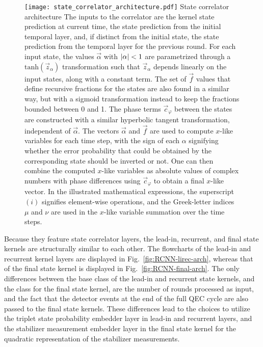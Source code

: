 \begin{figure*}[htb]
\centering
\texttt{[image: state\_correlator\_architecture.pdf]}
\ccaption
{State correlator architecture}
{
The inputs to the correlator are the kernel state prediction at current time, the state prediction from the initial temporal layer, and, if distinct from the initial state, the state prediction from the temporal layer for the previous round. 
For each input state, the values $\vec{\alpha}$ with $\lvert \alpha \rvert<1$ are parametrized through a $\mathrm{tanh}(\vec{z}_\alpha)$ transformation such that $\vec{z}_\alpha$ depends linearly on the input states, along with a constant term. The set of $\vec{f}$ values that define recursive fractions for the states are also found in a similar way, but with a sigmoid transformation instead to keep the fractions bounded between 0 and 1. 
The phase terms $\vec{c}_\varphi$ between the states are constructed with a similar hyperbolic tangent transformation, independent of $\vec{\alpha}$. 
The vectors $\vec{\alpha}$ and $\vec{f}$ are used to compute $x$-like variables for each time step, with the sign of each $\alpha$ signifying whether the error probability that could be obtained by the corresponding state should be inverted or not. One can then combine the computed $x$-like variables as absolute values of complex numbers with phase differences using $\vec{c}_\varphi$ to obtain a final $x$-like vector. In the illustrated mathematical expressions, the superscript $(i)$ signifies element-wise operations, and the Greek-letter indices $\mu$ and $\nu$ are used in the $x$-like variable summation over the time steps.
}
\label{fig:RCNN-state-corr}
\end{figure*}


Because they feature state correlator layers, the lead-in, recurrent, and final state kernels are structurally similar to each other. 
The flowcharts of the lead-in and recurrent kernel layers are displayed in Fig.~\ref{fig:RCNN-lirec-arch}, whereas that of the final state kernel is displayed in Fig.~\ref{fig:RCNN-final-arch}.
The only differences between the base class of the lead-in and recurrent state kernels, and the class for the final state kernel, are the number of rounds processed as input, and the fact that the  detector events at the end of the full QEC cycle are also passed to the final state kernels.
These differences lead to the choices to utilize the triplet state probability embedder layer in lead-in and recurrent layers, and the stabilizer measurement embedder layer in the final state kernel for the quadratic representation of the stabilizer measurements.


